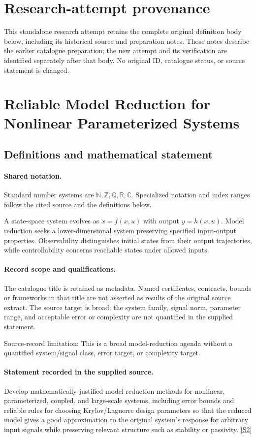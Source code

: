 \documentclass[11pt]{article}
\begin{document}
\section*{Research-attempt provenance}
This standalone research attempt retains the complete original definition body below,
including its historical source and preparation notes. Those notes describe the
earlier catalogue preparation; the new attempt and its verification are identified
separately after that body. No original ID, catalogue status, or source statement is changed.

\section{Reliable Model Reduction for Nonlinear Parameterized Systems}\label{statement}

\subsection{Definitions and mathematical statement}

\paragraph{Shared notation.}Standard number systems are $\mathbb N,\mathbb Z,\mathbb Q,\mathbb R,\mathbb C$. Specialized notation and index ranges follow the cited source and the definitions below.


A state-space system evolves as $\dot x=f(x,u)$ with output $y=h(x,u)$. Model reduction seeks a lower-dimensional system preserving specified input-output properties. Observability distinguishes initial states from their output trajectories, while controllability concerns reachable states under allowed inputs.
\paragraph{Record scope and qualifications.}
The catalogue title is retained as metadata. Named certificates, contracts, bounds or frameworks in that title are not asserted as results of the original source extract.
The source target is broad: the system family, signal norm, parameter range, and acceptable error or complexity are not quantified in the supplied statement.

Source-record limitation: This is a broad model-reduction agenda without a quantified system/signal class, error target, or complexity target.
\paragraph{Statement recorded in the supplied source.}
Develop mathematically justified model-reduction methods for nonlinear, parameterized, coupled, and large-scale systems, including error bounds and reliable rules for choosing Krylov/Laguerre design parameters so that the reduced model gives a good approximation to the original system's response for arbitrary input signals while preserving relevant structure such as stability or passivity. \href{https://doi.org/10.4171/owr/2009/11}{[S2]}
\end{document}
